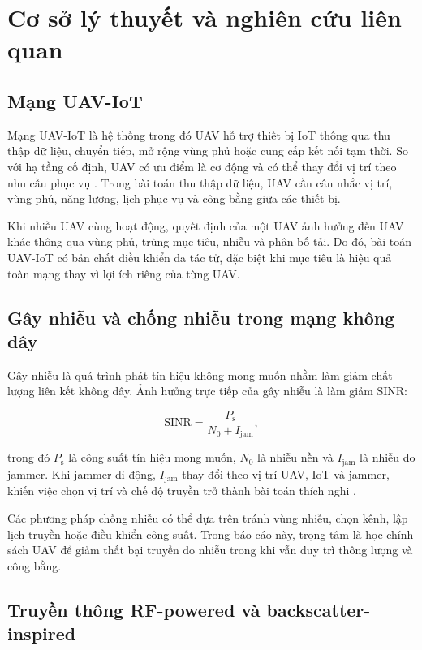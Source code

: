\chapter{Cơ sở lý thuyết và nghiên cứu liên quan}

\section{Mạng UAV-IoT}

Mạng UAV-IoT là hệ thống trong đó UAV hỗ trợ thiết bị IoT thông qua thu thập dữ liệu, chuyển tiếp, mở rộng vùng phủ hoặc cung cấp kết nối tạm thời. So với hạ tầng cố định, UAV có ưu điểm là cơ động và có thể thay đổi vị trí theo nhu cầu phục vụ \cite{uav_iot_survey_todo}. Trong bài toán thu thập dữ liệu, UAV cần cân nhắc vị trí, vùng phủ, năng lượng, lịch phục vụ và công bằng giữa các thiết bị.

Khi nhiều UAV cùng hoạt động, quyết định của một UAV ảnh hưởng đến UAV khác thông qua vùng phủ, trùng mục tiêu, nhiễu và phân bố tải. Do đó, bài toán UAV-IoT có bản chất điều khiển đa tác tử, đặc biệt khi mục tiêu là hiệu quả toàn mạng thay vì lợi ích riêng của từng UAV.

\section{Gây nhiễu và chống nhiễu trong mạng không dây}

Gây nhiễu là quá trình phát tín hiệu không mong muốn nhằm làm giảm chất lượng liên kết không dây. Ảnh hưởng trực tiếp của gây nhiễu là làm giảm SINR:

\begin{equation}
\mathrm{SINR}=\frac{P_{\mathrm{s}}}{N_0+I_{\mathrm{jam}}},
\label{eq:background_sinr}
\end{equation}

trong đó \(P_{\mathrm{s}}\) là công suất tín hiệu mong muốn, \(N_0\) là nhiễu nền và \(I_{\mathrm{jam}}\) là nhiễu do jammer. Khi jammer di động, \(I_{\mathrm{jam}}\) thay đổi theo vị trí UAV, IoT và jammer, khiến việc chọn vị trí và chế độ truyền trở thành bài toán thích nghi \cite{anti_jamming_todo}.

Các phương pháp chống nhiễu có thể dựa trên tránh vùng nhiễu, chọn kênh, lập lịch truyền hoặc điều khiển công suất. Trong báo cáo này, trọng tâm là học chính sách UAV để giảm thất bại truyền do nhiễu trong khi vẫn duy trì thông lượng và công bằng.

\section{Truyền thông RF-powered và backscatter-inspired}

